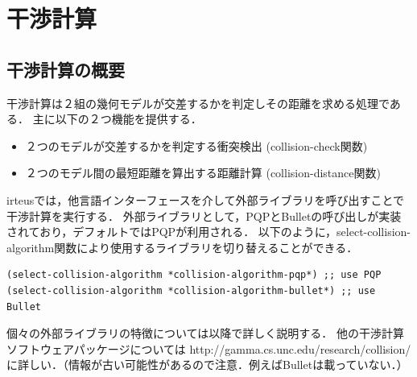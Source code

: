 \section{干渉計算}

\subsection{干渉計算の概要}

干渉計算は２組の幾何モデルが交差するかを判定しその距離を求める処理である．
主に以下の２つ機能を提供する．
\begin{itemize}
  \item ２つのモデルが交差するかを判定する衝突検出 (collision-check関数)
  \item ２つのモデル間の最短距離を算出する距離計算 (collision-distance関数)
\end{itemize}

irteusでは，他言語インターフェースを介して外部ライブラリを呼び出すことで干渉計算を実行する．
外部ライブラリとして，PQPとBulletの呼び出しが実装されており，デフォルトではPQPが利用される．
以下のように，select-collision-algorithm関数により使用するライブラリを切り替えることができる．
{\baselineskip=10pt
\begin{verbatim}
(select-collision-algorithm *collision-algorithm-pqp*) ;; use PQP
(select-collision-algorithm *collision-algorithm-bullet*) ;; use Bullet
\end{verbatim}
}

個々の外部ライブラリの特徴については以降で詳しく説明する．
他の干渉計算ソフトウェアパッケージについては http://gamma.cs.unc.edu/research/collision/に詳しい．（情報が古い可能性があるので注意．例えばBulletは載っていない．）



